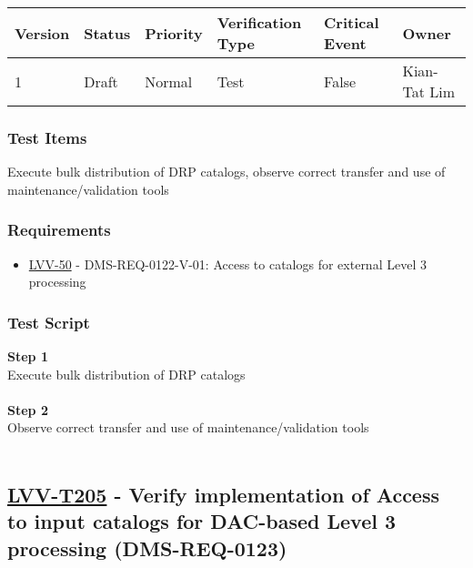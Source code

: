 \begin{longtable}[]{@{}llllll@{}}
\toprule
Version & Status & Priority & Verification Type & Critical Event &
Owner\tabularnewline
\midrule
\endhead
1 & Draft & Normal & Test & False & Kian-Tat Lim\tabularnewline
\bottomrule
\end{longtable}

\hypertarget{test-items-180}{%
\subsubsection{Test Items}\label{test-items-180}}

Execute bulk distribution of DRP catalogs, observe correct transfer and
use of maintenance/validation tools

\hypertarget{requirements-181}{%
\subsubsection{Requirements}\label{requirements-181}}

\begin{itemize}
\tightlist
\item
  \href{https://jira.lsstcorp.org/browse/LVV-50}{LVV-50} -
  DMS-REQ-0122-V-01: Access to catalogs for external Level 3 processing
\end{itemize}

\hypertarget{test-script-181}{%
\subsubsection{Test Script}\label{test-script-181}}

\textbf{Step 1}\\
Execute bulk distribution of DRP catalogs\\
~\\
\textbf{Step 2}\\
Observe correct transfer and use of maintenance/validation tools\\
~\\

\hypertarget{lvv-t205---verify-implementation-of-access-to-input-catalogs-for-dac-based-level-3-processing-dms-req-0123}{%
\subsection{\texorpdfstring{\href{https://jira.lsstcorp.org/secure/Tests.jspa\#/testCase/LVV-T205}{LVV-T205}
- Verify implementation of Access to input catalogs for DAC-based Level
3 processing
(DMS-REQ-0123)}{LVV-T205 - Verify implementation of Access to input catalogs for DAC-based Level 3 processing (DMS-REQ-0123)}}\label{lvv-t205---verify-implementation-of-access-to-input-catalogs-for-dac-based-level-3-processing-dms-req-0123}}

